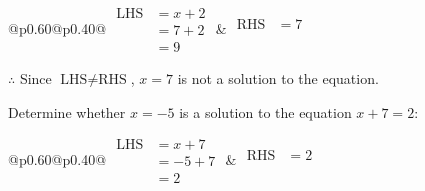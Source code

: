 \documentclass[12pt]{article}
\newcounter{minipagecount}
\begin{document}
\begin{multicols}{2}
\begin{minipage}[t]{0.40\textwidth}
    \noindent
    \renewcommand{\arraystretch}{1.3} %
    \begin{tabular}{@{}p{0.60\linewidth}@{}p{0.40\linewidth}@{}}
        \(\begin{aligned}
            \text{LHS} &= x + 2 \\
                    &= 7 + 2 \\
                    &= 9
        \end{aligned}\) &
        \(\begin{aligned}
            \text{RHS} &= 7\\
                    & \\
                    &
        \end{aligned}\)
    \end{tabular}
    \renewcommand{\arraystretch}{1.0} %
    \vspace{2pt}  %

    \noindent \(\therefore\) Since \(\text{LHS} \neq \text{RHS}\), \(x = 7\) is not  a solution to the equation.

\end{minipage}

 \vspace*{16pt}
\noindent{(\theminipagecount)}\hspace{0.1mm} %
\begin{minipage}[t]{0.40\textwidth} %

    \noindent Determine whether \(x = -5\) is a solution to the equation \(x + 7 = 2\):
    \vspace{4pt}  %

    \noindent
    \renewcommand{\arraystretch}{1.3} %
    \begin{tabular}{@{}p{0.60\linewidth}@{}p{0.40\linewidth}@{}}
        \(\begin{aligned}
            \text{LHS} &= x + 7 \\
                    &= -5 + 7 \\
                    &= 2
        \end{aligned}\) &
        \(\begin{aligned}
            \text{RHS} &= 2\\
                    & \\
                    &
        \end{aligned}\)
    \end{tabular}
    \renewcommand{\arraystretch}{1.0} %
    \vspace{2pt}  %


\end{minipage}
\end{multicols}
\end{document}
